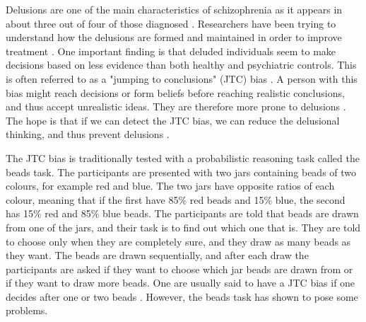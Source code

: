 Delusions are one of the main characteristics of schizophrenia as it appears in about three out of four of those diagnosed \citep{garety2011}. Researchers have been trying to understand how the delusions are formed and maintained in order to improve treatment \citep{dudley_meta_2016}. One important finding is that deluded individuals seem to make decisions based on less evidence than both healthy and psychiatric controls. This is often referred to as a "jumping to conclusions" (JTC) bias \citep{dudley_meta_2016}. A person with this bias might reach decisions or form beliefs before reaching realistic conclusions, and thus accept unrealistic ideas. They are therefore more prone to delusions \citep{dudley_meta_2016}. The hope is that if we can detect the JTC bias, we can reduce the delusional thinking, and thus prevent delusions \citep{dudley_meta_2016}.

The JTC bias is traditionally tested with a probabilistic reasoning task called the beads task. The participants are presented with two jars containing beads of two colours, for example red and blue. The two jars have opposite ratios of each colour, meaning that if the first have 85\% red beads and 15\% blue, the second has 15\% red and 85\% blue beads. The participants are told that beads are drawn from one of the jars, and their task is to find out which one that is. They are told to choose only when they are completely sure, and they draw as many beads as they want. The beads are drawn sequentially, and after each draw the participants are asked if they want to choose which jar beads are drawn from or if they want to draw more beads. One are usually said to have a JTC bias if one decides after one or two beads \citep{moritz2017}. However, the beads task has shown to pose some problems.

